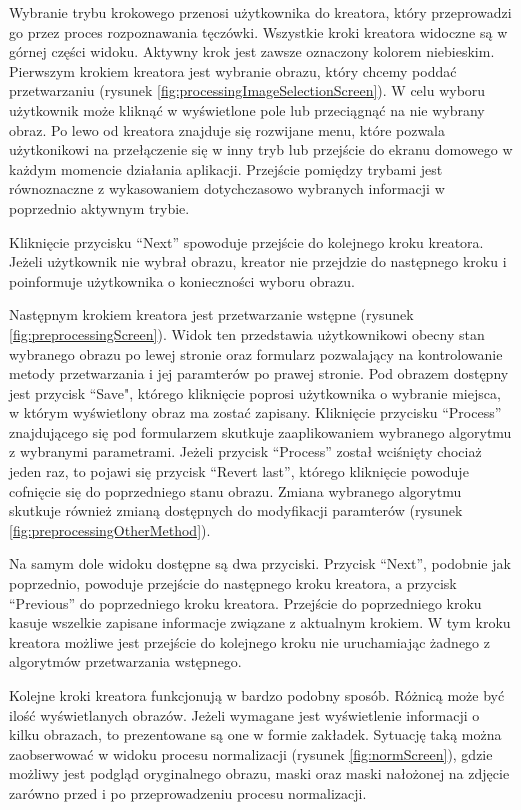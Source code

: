 Wybranie trybu krokowego przenosi użytkownika do kreatora, który przeprowadzi go przez proces
rozpoznawania tęczówki. Wszystkie kroki kreatora widoczne są w górnej części widoku. Aktywny krok
jest zawsze oznaczony kolorem niebieskim. Pierwszym krokiem kreatora jest wybranie obrazu, który chcemy
podda\'c przetwarzaniu (rysunek \ref{fig:processingImageSelectionScreen}). W celu wyboru użytkownik może klikną\'c w wyświetlone pole lub
przeciągną\'c na nie wybrany obraz. Po lewo od kreatora znajduje się rozwijane menu, które
pozwala użytkonikowi na przełączenie się w inny tryb lub przejście do ekranu domowego w każdym
momencie działania aplikacji. Przejście pomiędzy trybami jest równoznaczne z wykasowaniem
dotychczasowo wybranych informacji w poprzednio aktywnym trybie.

Kliknięcie przycisku ``Next'' spowoduje przejście do kolejnego kroku kreatora. Jeżeli użytkownik
nie wybrał obrazu, kreator nie przejdzie do następnego kroku i poinformuje użytkownika o konieczności
wyboru obrazu.\newline

Następnym krokiem kreatora jest przetwarzanie wstępne (rysunek \ref{fig:preprocessingScreen}). Widok ten
przedstawia użytkownikowi obecny stan wybranego obrazu po lewej stronie oraz formularz pozwalający
na kontrolowanie metody przetwarzania i jej paramterów po prawej stronie. Pod obrazem dostępny jest
przycisk ``Save", którego kliknięcie poprosi użytkownika o wybranie miejsca, w którym wyświetlony obraz
ma zosta\'c zapisany. Kliknięcie przycisku ``Process'' znajdującego się pod formularzem skutkuje
zaaplikowaniem wybranego algorytmu z wybranymi parametrami. Jeżeli przycisk ``Process'' został wciśnięty
chociaż jeden raz, to pojawi się przycisk ``Revert last'', którego kliknięcie powoduje cofnięcie się
do poprzedniego stanu obrazu. Zmiana wybranego algorytmu skutkuje również zmianą dostępnych
do modyfikacji paramterów (rysunek \ref{fig:preprocessingOtherMethod}).

Na samym dole widoku dostępne są dwa przyciski. Przycisk ``Next'', podobnie
jak poprzednio, powoduje przejście do następnego kroku kreatora, a przycisk ``Previous'' do poprzedniego
kroku kreatora. Przejście do poprzedniego kroku kasuje wszelkie zapisane informacje związane z aktualnym
krokiem. W tym kroku kreatora możliwe jest przejście do kolejnego kroku nie uruchamiając żadnego z
algorytmów przetwarzania wstępnego.\newline

Kolejne kroki kreatora funkcjonują w bardzo podobny sposób. Różnicą może by\'c iloś\'c wyświetlanych
obrazów. Jeżeli wymagane jest wyświetlenie informacji o kilku obrazach, to prezentowane są one w formie
zakładek. Sytuację taką można zaobserwowa\'c w widoku procesu normalizacji (rysunek \ref{fig:normScreen}),
gdzie możliwy jest podgląd oryginalnego obrazu, maski oraz maski nałożonej na
zdjęcie zarówno przed i po przeprowadzeniu procesu normalizacji.\newline

